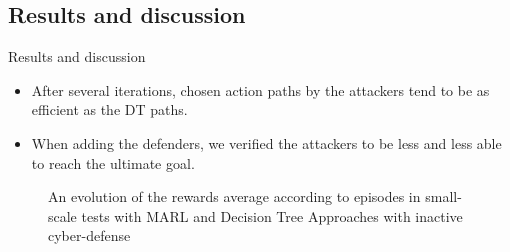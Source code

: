 




 


 	\subsection{Results and discussion}

 	\begin{frame}{Results and discussion}
		{}

        \begin{itemize}
            \item After several iterations, chosen action paths by the attackers tend to be as efficient as the DT paths.
            \item When adding the defenders, we verified the attackers to be less and less able to reach the ultimate goal.
        \end{itemize}

        \begin{figure}
            \centering
            

            \vspace{-0.2cm}
            
            \caption{An evolution of the rewards average according to episodes in small-scale tests with MARL and Decision Tree Approaches with inactive cyber-defense
            }
            \label{fig:graphs}
        \end{figure}
 
	\end{frame}
